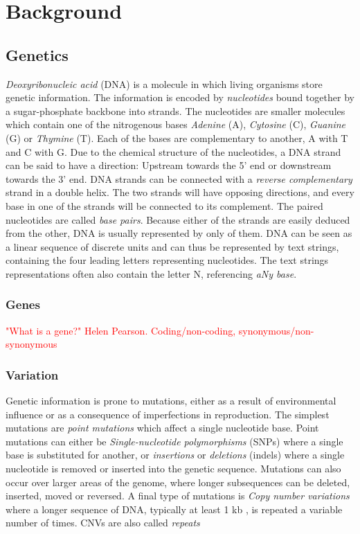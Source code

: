 \documentclass[thesis.tex]{subfiles}
\begin{document}
\chapter{Background}
\section{Genetics}
\textit{Deoxyribonucleic acid} (DNA) is a molecule in which living organisms store genetic information. The information is encoded by \textit{nucleotides} bound together by a sugar-phosphate backbone into strands. The nucleotides are smaller molecules which contain one of the nitrogenous bases \textit{Adenine} (A), \textit{Cytosine} (C), \textit{Guanine} (G) or \textit{Thymine} (T). Each of the bases are complementary to another, A with T and C with G. Due to the chemical structure of the nucleotides, a DNA strand can be said to have a direction: Upstream towards the 5' end or downstream towards the 3' end. DNA strands can be connected with a \textit{reverse complementary} strand in a double helix. The two strands will have opposing directions, and every base in one of the strands will be connected to its complement. The paired nucleotides are called \textit{base pairs}. Because either of the strands are easily deduced from the other, DNA is usually represented by only of them. DNA can be seen as a linear sequence of discrete units and can thus be represented by text strings, containing the four leading letters representing nucleotides. The text strings representations often also contain the letter N, referencing \textit{aNy base}.
\subsection{Genes}
\textcolor{red}{"What is a gene?" Helen Pearson. Coding/non-coding, synonymous/non-synonymous}
\subsection{Variation}
Genetic information is prone to mutations, either as a result of environmental influence or as a consequence of imperfections in reproduction. The simplest mutations are \textit{point mutations} which affect a single nucleotide base. Point mutations can either be \textit{Single-nucleotide polymorphisms} (SNPs) where a single base is substituted for another, or \textit{insertions} or \textit{deletions} (indels) where a single nucleotide is removed or inserted into the genetic sequence. Mutations can also occur over larger areas of the genome, where longer subsequences can be deleted, inserted, moved or reversed. A final type of mutations is \textit{Copy number variations} where a longer sequence of DNA, typically at least 1 kb \cite{copy_number_variation_new_insights_in_genome_diversity}, is repeated a variable number of times. CNVs are also called \textit{repeats}\\
\end{document}
